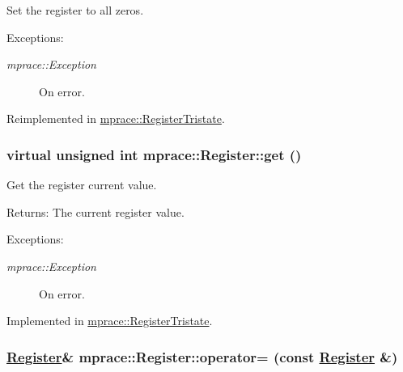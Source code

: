 Set the register to all zeros. 

\begin{Desc}
\item[Exceptions:]
\begin{description}
\item[{\em mprace::Exception}]On error.\end{description}
\end{Desc}


Reimplemented in \hyperlink{classmprace_1_1RegisterTristate_a7}{mprace::Register\-Tristate}.\hypertarget{classmprace_1_1Register_a2}{
\subsubsection[get]{\setlength{\rightskip}{0pt plus 5cm}virtual unsigned int mprace::Register::get ()}}
\label{classmprace_1_1Register_a2}


Get the register current value. 

\begin{Desc}
\item[Returns:]The current register value. \end{Desc}
\begin{Desc}
\item[Exceptions:]
\begin{description}
\item[{\em mprace::Exception}]On error.\end{description}
\end{Desc}


Implemented in \hyperlink{classmprace_1_1RegisterTristate_a5}{mprace::Register\-Tristate}.\hypertarget{classmprace_1_1Register_b2}{
\subsubsection[operator=]{\setlength{\rightskip}{0pt plus 5cm}\hyperlink{classmprace_1_1Register}{Register}\& mprace::Register::operator= (const \hyperlink{classmprace_1_1Register}{Register} \&)}}
\label{classmprace_1_1Register_b2}


